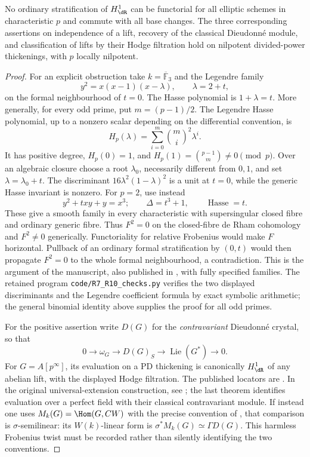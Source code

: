 \begin{proposition}[R9, scans 6:22--27]\label{prop:DE-R9}
No ordinary stratification of $H^1_{\dR}$ can be functorial for all elliptic schemes in characteristic $p$ and commute with all base changes.  The three corresponding assertions on independence of a lift, recovery of the classical Dieudonn\'e module, and classification of lifts by their Hodge filtration hold on nilpotent divided-power thickenings, with $p$ locally nilpotent.
\end{proposition}
\begin{proof}
For an explicit obstruction take $k=\overline{\mathbb F}_3$ and the Legendre family
\[
 y^2=x(x-1)(x-\lambda),\qquad \lambda=2+t,
\]
on the formal neighbourhood of $t=0$.  The Hasse polynomial is $1+\lambda=t$.  More generally, for every odd prime, put $m=(p-1)/2$.  The Legendre Hasse polynomial, up to a nonzero scalar depending on the differential convention, is
\[
 H_p(\lambda)=\sum_{i=0}^m\binom mi^2\lambda^i.
\]
It has positive degree, $H_p(0)=1$, and
$H_p(1)=\binom{p-1}{m}\ne0\pmod p$.  Over an algebraic closure choose a root $\lambda_0$, necessarily different from $0,1$, and set $\lambda=\lambda_0+t$.  The discriminant $16\lambda^2(1-\lambda)^2$ is a unit at $t=0$, while the generic Hasse invariant is nonzero.  For $p=2$, use instead
\[
 y^2+txy+y=x^3;
 \qquad\Delta=t^3+1,\qquad\operatorname{Hasse}=t.
\]
These give a smooth family in every characteristic with supersingular closed fibre and ordinary generic fibre.  Thus $F^2=0$ on the closed-fibre de Rham cohomology and $F^2\ne0$ generically.  Functoriality for relative Frobenius would make $F$ horizontal.  Pullback of an ordinary formal stratification by $(0,t)$ would then propagate $F^2=0$ to the whole formal neighbourhood, a contradiction.  This is the argument of the manuscript, also published in \cite[\S3.5]{Grothendieck1968Crystals}, with fully specified families.  The retained program \texttt{code/R7\_R10\_checks.py} verifies the two displayed discriminants and the Legendre coefficient formula by exact symbolic arithmetic; the general binomial identity above supplies the proof for all odd primes.

For the positive assertion write $D(G)$ for the \emph{contravariant} Dieudonn\'e crystal, so that
\[
 0\longrightarrow\omega_G\longrightarrow D(G)_S
       \longrightarrow\operatorname{Lie}(G^*)\longrightarrow0.
\]
For $G=A[p^\infty]$, its evaluation on a PD thickening is canonically $H^1_{\dR}$ of any abelian lift, with the displayed Hodge filtration.  The published locators are \cite[\S2.2, Theorem~2; \S3, Proposition~2 and (3.1)]{BerthelotMessing1979}.  In the original universal-extension construction, see \cite[Chapter~I, Proposition~4.1.7; Chapter~II, (9.2), (13.5), Theorem~15.3]{MazurMessing1974}; the last theorem identifies evaluation over a perfect field with their classical contravariant module.  If instead one uses $M_k(G)=\Hom(G,CW)$ with the precise convention of \cite[\S4.3, Theorem~4 and Remark~1]{BerthelotMessing1979}, that comparison is $\sigma$-semilinear: its $W(k)$-linear form is $\sigma^*M_k(G)\simeq\Gamma D(G)$.  This harmless Frobenius twist must be recorded rather than silently identifying the two conventions.


\end{proof}
